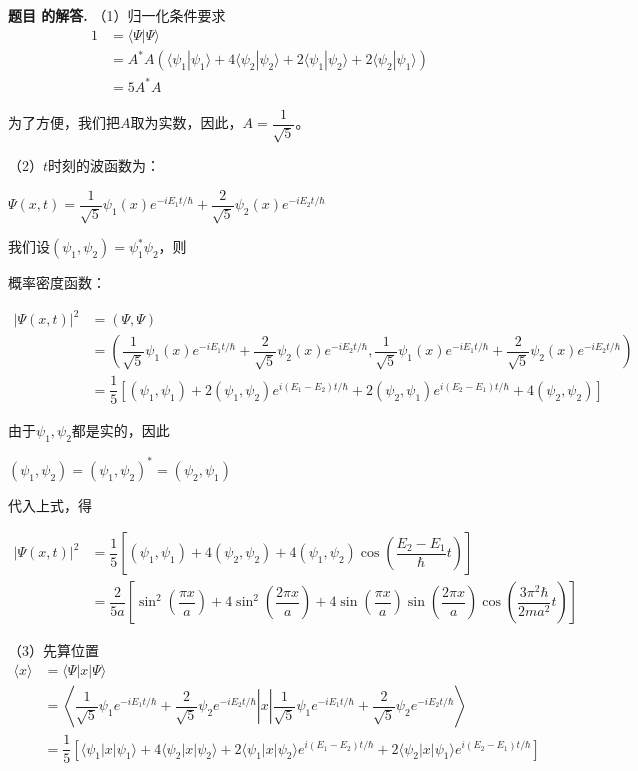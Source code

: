 \documentclass[12pt, a4paper, oneside]{ctexart}
\newcounter{problemname}
\newenvironment{solution}
  {\par\noindent\textbf{题目 \theproblemname 的解答. }}
  {\par}
\begin{document}
\begin{solution}
  （1）归一化条件要求
  \begin{align*}
    1 &= \langle \varPsi | \varPsi \rangle \\
    &= A^*A \left(\langle \psi_1 | \psi_1 \rangle + 4\langle \psi_2 | \psi_2 \rangle + 2\langle \psi_1 | \psi_2 \rangle + 2\langle \psi_2 | \psi_1 \rangle\right) \\
    &= 5 A^*A
  \end{align*}

  为了方便，我们把$A$取为实数，因此，$A = \dfrac{1}{\sqrt{5}}$。

  （2）$t$时刻的波函数为：

  \centerline{$\varPsi(x,t) = \dfrac{1}{\sqrt{5}}\psi_1(x)e^{-iE_1t/\hbar} + \dfrac{2}{\sqrt{5}}\psi_2(x)e^{-iE_2t/\hbar}$}


  我们设$(\psi_1,\psi_2) = \psi_1^* \psi_2$，则

  概率密度函数：

  \begin{align*}
    |\Psi(x,t)|^2 &= \left( \varPsi , \varPsi \right)\\
    &= \left( \dfrac{1}{\sqrt{5}}\psi_1(x)e^{-iE_1t/\hbar} + \dfrac{2}{\sqrt{5}}\psi_2(x)e^{-iE_2t/\hbar}, \dfrac{1}{\sqrt{5}}\psi_1(x)e^{-iE_1t/\hbar} + \dfrac{2}{\sqrt{5}}\psi_2(x)e^{-iE_2t/\hbar}\right) \\
    &= \dfrac{1}{5} \left[ ( \psi_1 , \psi_1 ) + 2 ( \psi_1,\psi_2 ) e^{i(E_1 - E_2)t / \hbar} + 2 ( \psi_2,\psi_1 ) e^{i(E_2 - E_1)t / \hbar} + 4 ( \psi_2 ,\psi_2 )\right]
  \end{align*}

  由于$\psi_1,\psi_2$都是实的，因此

  \centerline{$( \psi_1 , \psi_2 ) = ( \psi_1 , \psi_2 ) ^* = ( \psi_2 , \psi_1 ) $}

  代入上式，得

  \begin{align*}
    |\Psi(x,t)|^2 &= \dfrac{1}{5} \left[ ( \psi_1 , \psi_1 ) + 4 ( \psi_2 ,\psi_2 ) + 4 ( \psi_1,\psi_2 ) \cos\left(\dfrac{E_2 - E_1}{\hbar}t\right) \right] \\
    &= \dfrac{2}{5a} \left[  \sin^2\left(\dfrac{\pi x}{a}\right) + 4\sin^2\left(\dfrac{2\pi x}{a}\right) + 4 \sin\left(\dfrac{\pi x}{a}\right)\sin\left(\dfrac{2\pi x}{a}\right) \cos\left(\dfrac{3\pi^2\hbar}{2ma^2}t\right) \right]
  \end{align*}

  （3）先算位置
  \begin{align*}
    \langle x \rangle &= \langle \varPsi | x | \varPsi \rangle \\
    &= \left\langle \left.\dfrac{1}{\sqrt{5}}\psi_1 e^{-iE_1t/\hbar} + \dfrac{2}{\sqrt{5}}\psi_2 e^{-iE_2t/\hbar} \right| x \left| \dfrac{1}{\sqrt{5}}\psi_1 e^{-iE_1t/\hbar} + \dfrac{2}{\sqrt{5}}\psi_2 e^{-iE_2t/\hbar} \right.\right\rangle \\
    &= \dfrac{1}{5} \left[ \langle \psi_1 | x|\psi_1 \rangle + 4\langle \psi_2 | x|\psi_2 \rangle +2\langle \psi_1 | x|\psi_2 \rangle e^{i(E_1 - E_2)t/\hbar} + 2\langle\psi_2|x|\psi_1\rangle e^{i(E_2 - E_1)t/\hbar}\right] \\
  \end{align*}
  

\end{solution}
\end{document}
